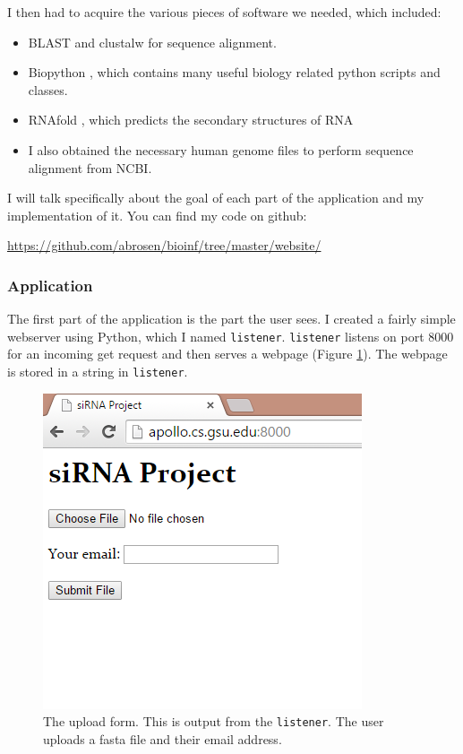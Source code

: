 \documentclass[10pt,letterpaper]{article}
\begin{document}
I then had to acquire the various pieces of software we needed, which included:

\begin{itemize}
	\item BLAST \cite{blast} and clustalw \cite{thompson2002multiple} for sequence alignment.
	\item Biopython \cite{cock2009biopython}, which contains many useful biology related python scripts and classes.
	\item RNAfold \cite{lorenz2011viennarna},  which predicts the secondary structures of RNA
	\item I also obtained the necessary human genome files to perform sequence alignment from NCBI.
\end{itemize}

I will talk specifically about the goal of each part of the application and my implementation of it.
You can find my code on github: 

\url{https://github.com/abrosen/bioinf/tree/master/website/}

\subsubsection{Application}
The first part of the application is the part the user sees.
I created a fairly simple webserver using Python, which I named \texttt{listener}.
\texttt{listener} listens on port 8000 for an incoming get request and then serves a webpage (Figure \ref{fig:website}). 
The webpage is stored in a string in \texttt{listener}.

\begin{figure}
\centering
\includegraphics[width=0.5\linewidth]{website}
\caption{The upload form. This is output from the \texttt{listener}.  
	The user uploads a fasta file and their email address.}
\label{fig:website}
\end{figure}
\end{document}
